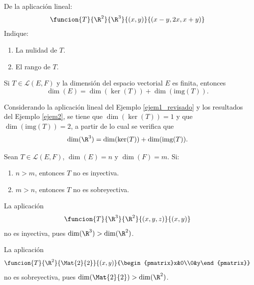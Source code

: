 \documentclass[compacto,10pt]{pubciencias-notas}
\begin{document}
\begin{ejer}
De la aplicación lineal:
\[
 \funcion{T}{\R^2}{\R^3}{(x,y)}{(x-y,2x,x+y)}
\] 
Indique:
\begin{enumerate}
    \item[$a)$] La nulidad de $T$.
    \item[$b)$] El rango de $T$.
\end{enumerate}
\end{ejer}

\begin{teo}
    Si $T \in \mathscr{L}(E,F)$ y la dimensión del espacio vectorial $E$ es finita, entonces
    \[
        \dim(E) = \dim(\ker(T)) + \dim(\text{img}(T)).
    \]
\end{teo}  

\begin{ejem}\hspace{0pt}
Considerando la aplicación lineal del Ejemplo \ref{ejem1_revisado} y los resultados del Ejemplo \ref{ejem2}, se tiene que $\dim(\ker(T)) = 1$ y que $\dim(\text{img}(T)) = 2$, a partir de lo cual se verifica que 
    \[
        \dim(\R^{3}) = \dim(\ker(T)) + \dim(\text{img}(T)).
    \]
\end{ejem}

\begin{teo}
Sean $T\in\mathscr{L}(E,F)$, $\dim(E)=n$ y $\dim(F)=m$. Si:
\begin{enumerate}
    \item $n>m$, entonces $T$ no es inyectiva.
    \item $m>n$, entonces $T$ no es sobreyectiva.
\end{enumerate}
\end{teo}

\begin{ejem}\hspace{0pt}
La aplicación
\[
    \funcion{T}{\R^3}{\R^2}{(x,y,z)}{(x,y)}
\]
no es inyectiva, pues $\dim(\R^{3}) > \dim(\R^{2})$. 
\end{ejem}

\begin{ejem}\hspace{0pt}
La aplicación
\[
    \funcion{T}{\R^2}{\Mat{2}{2}}{(x,y)}{\begin{pmatrix}x&0\\0&y\end{pmatrix}}
\]
no es sobreyectiva, pues $\dim(\Mat{2}{2}) > \dim(\R^{2})$.
\end{ejem}
\end{document}
